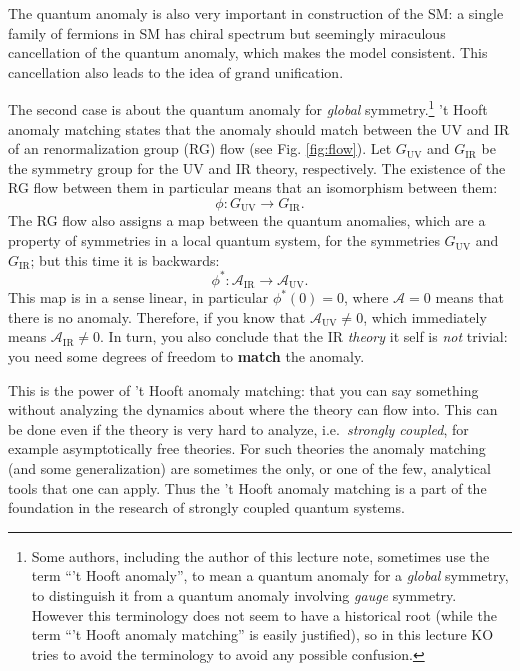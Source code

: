 \documentclass[
]{scrartcl}
\numberwithin{equation}{section}
\theoremstyle{definition}
\theoremstyle{definition}
\theoremstyle{definition}
\theoremstyle{definition}
\theoremstyle{remark}
\begin{document}
The quantum anomaly is also very important in construction of the SM: a single family of fermions in SM has chiral spectrum but seemingly miraculous cancellation of the quantum anomaly, which makes the model consistent. This cancellation also leads to the idea of grand unification.

The second case is about the quantum anomaly for \emph{global} symmetry.\footnote{Some authors, including the author of this lecture note, sometimes use the term ``'t Hooft anomaly'', to mean a quantum anomaly for a \emph{global} symmetry, to distinguish it from a quantum anomaly involving \emph{gauge} symmetry. However this terminology does not seem to have a historical root (while the term ``'t Hooft anomaly matching'' is easily justified), so in this lecture KO tries to avoid the terminology to avoid any possible confusion.}
't Hooft anomaly matching states that the anomaly should match between the UV and IR of an renormalization group (RG) flow (see Fig. \ref{fig:flow}).
Let \(G_\text{UV}\) and \(G_\text{IR}\) be the symmetry group for the UV and IR theory, respectively.
The existence of the RG flow between them in particular means that an isomorphism between them:
\begin{equation}
  \label{eq:Ghom}
  \phi: G_\text{UV} \to G_\text{IR}.
\end{equation}
The RG flow also assigns a map between the quantum anomalies, which are a property of symmetries in a local quantum system, for the symmetries \(G_\text{UV}\) and \(G_\text{IR}\);
but this time it is backwards:
\begin{equation}
  \label{eq:pullback}
  \phi^*: \mathcal{A}_\text{IR} \to \mathcal{A}_\text{UV}.
\end{equation}
This map is in a sense linear, in particular \(\phi^* (0) = 0\), where \(\mathcal{A}=0\) means that there is no anomaly.
Therefore, if you know that \(\mathcal{A}_\text{UV}\neq 0\), which immediately means \(\mathcal{A}_\text{IR}\neq 0\).
In turn, you also conclude that the IR \emph{theory} it self is \emph{not} trivial: you need some degrees of freedom to \textbf{match} the anomaly.

This is the power of 't Hooft anomaly matching: that you can say something without analyzing the dynamics about where the theory can flow into.
This can be done even if the theory is very hard to analyze, i.e.~\emph{strongly coupled}, for example asymptotically free theories.
For such theories the anomaly matching (and some generalization) are sometimes the only, or one of the few, analytical tools that one can apply.
Thus the 't Hooft anomaly matching is a part of the foundation in the research of strongly coupled quantum systems.
\end{document}
